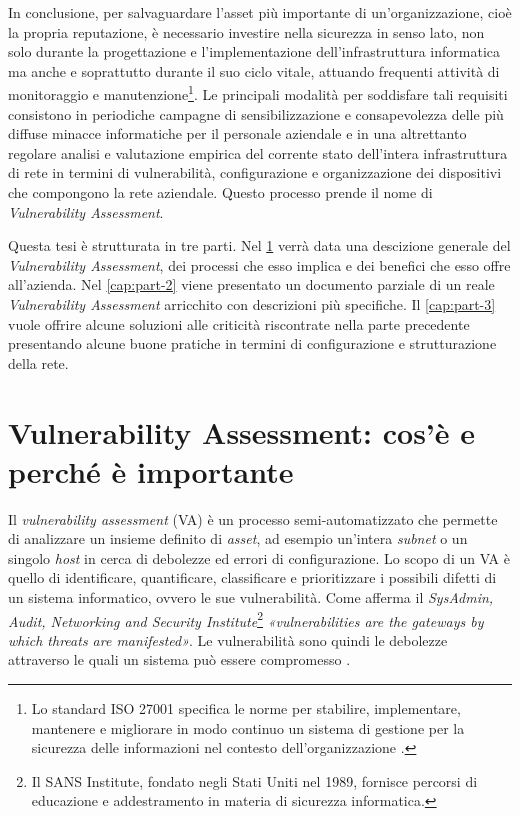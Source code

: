 \documentclass[target=bach,aauheader=]{thud}
\begin{document}
In conclusione, per salvaguardare l’asset più importante di un’organizzazione, cioè la propria reputazione, è necessario investire nella sicurezza in senso lato, non solo durante la progettazione e l’implementazione dell’infrastruttura informatica ma anche e soprattutto durante il suo ciclo vitale, attuando frequenti attività di monitoraggio e manutenzione\footnote{Lo standard ISO 27001 specifica le norme per stabilire, implementare, mantenere e migliorare in modo continuo un sistema di gestione per la sicurezza delle informazioni nel contesto dell’organizzazione \cite{27001}.}. Le principali modalità per soddisfare tali requisiti consistono in periodiche campagne di sensibilizzazione e consapevolezza delle più diffuse minacce informatiche per il personale aziendale e in una altrettanto regolare analisi e valutazione empirica del corrente stato dell’intera infrastruttura di rete in termini di vulnerabilità, configurazione e organizzazione dei dispositivi che compongono la rete aziendale.
Questo processo prende il nome di \textit{Vulnerability Assessment}.

Questa tesi è strutturata in tre parti. Nel \cref{cap:part-1} verrà data una descizione generale del \textit{Vulnerability Assessment}, dei processi che esso implica e dei benefici che esso offre all'azienda. Nel \cref{cap:part-2} viene presentato un documento parziale di un reale \textit{Vulnerability Assessment} arricchito con descrizioni più specifiche. Il \cref{cap:part-3} vuole offrire alcune soluzioni alle criticità riscontrate nella parte precedente presentando alcune buone pratiche in termini di configurazione e strutturazione della rete.


\chapter{Vulnerability Assessment: cos’è e perché è importante} \label{cap:part-1}

Il \textit{vulnerability assessment} (VA) è un processo semi-automatizzato che permette di analizzare un insieme definito di \textit{asset}, ad esempio un’intera \textit{subnet} o un singolo \textit{host} in cerca di debolezze ed errori di configurazione. Lo scopo di un VA è quello di identificare, quantificare, classificare e prioritizzare i possibili difetti di un sistema informatico, ovvero le sue vulnerabilità. Come afferma il \textit{SysAdmin, Audit, Networking and Security Institute}\footnote{Il SANS Institute, fondato negli Stati Uniti nel 1989, fornisce percorsi di educazione e addestramento in materia di sicurezza informatica.} \textit{«vulnerabilities are the gateways by which threats are manifested»}. Le vulnerabilità sono quindi le debolezze attraverso le quali un sistema può essere compromesso \cite{defsec} \cite{scanning}.
\end{document}

